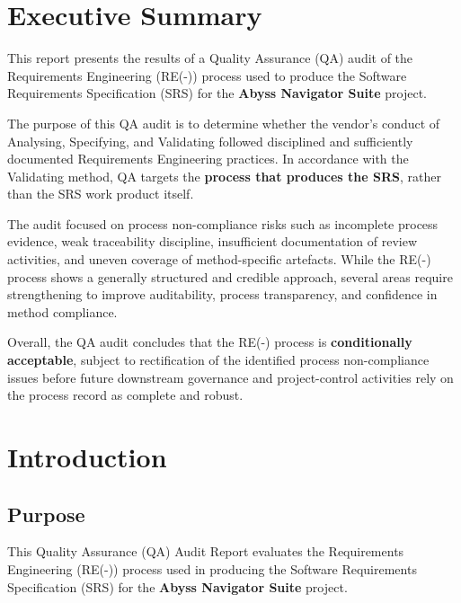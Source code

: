 \documentclass[11pt,a4paper]{article}
\begin{document}
\bigskip


\section{Executive Summary}

This report presents the results of a Quality Assurance (QA) audit of the
Requirements Engineering (RE(-)) process used to produce the Software
Requirements Specification (SRS) for the \textbf{Abyss Navigator Suite} project.

The purpose of this QA audit is to determine whether the vendor's conduct of
Analysing, Specifying, and Validating followed disciplined and sufficiently
documented Requirements Engineering practices. In accordance with the
Validating method, QA targets the \textbf{process that produces the SRS},
rather than the SRS work product itself.

The audit focused on process non-compliance risks such as incomplete process
evidence, weak traceability discipline, insufficient documentation of review
activities, and uneven coverage of method-specific artefacts. While the RE(-)
process shows a generally structured and credible approach, several areas
require strengthening to improve auditability, process transparency, and
confidence in method compliance.

Overall, the QA audit concludes that the RE(-) process is \textbf{conditionally
acceptable}, subject to rectification of the identified process non-compliance
issues before future downstream governance and project-control activities rely
on the process record as complete and robust.


\section{Introduction}

\subsection{Purpose}

This Quality Assurance (QA) Audit Report evaluates the Requirements Engineering (RE(-)) process used in producing the Software Requirements Specification (SRS) for the \textbf{Abyss Navigator Suite} project.
\end{document}
